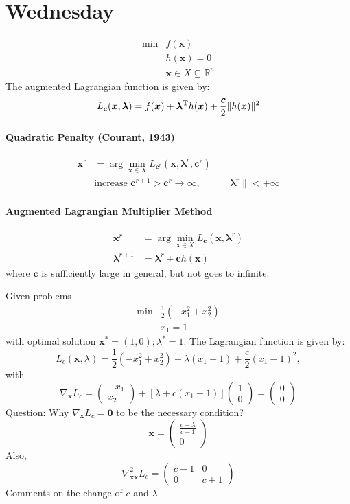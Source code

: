 \section{Wednesday}
\[
\begin{array}{ll}
\min&f(\bm x)\\
&h(\bm x)=0\\
&\bm x\in X\subseteq\mathbb{R}^n
\end{array}
\]
The augmented Lagrangian function is given by:
\[
L_{\bm c}(\bm x,\bm\lambda)=f(\bm x)+\bm\lambda^{\mathrm T} h(\bm x)+\frac{\bm c}{2}\|h(\bm x)\|^2
\]
\paragraph{Quadratic Penalty (Courant, 1943)} 
\begin{align*}
\bm x^r&=\arg\min_{\bm x\in X} L_{\bm c^r}(\bm x,\bm\lambda^r,\bm c^r)\\
&\mbox{increase $\bm c^{r+1}>\bm c^r$}\to\infty,\qquad
\|\bm\lambda^r\|<+\infty
\end{align*}

\paragraph{Augmented Lagrangian Multiplier Method}
\begin{align*}
\bm x^r&=\arg\min_{\bm x\in X}L_{\bm c}(\bm x,\bm\lambda^r)\\
\bm\lambda^{r+1}&=\bm\lambda^r+\bm c h(\bm x)
\end{align*}
where $\bm c$ is sufficiently large in general, but not goes to infinite.
\begin{example}
Given problems
\[
\begin{array}{ll}
\min&\frac{1}{2}(-x_1^2+x_2^2)\\
&x_1=1
\end{array}
\]
with optimal solution $\bm x^*=(1,0);\lambda^*=1$. The Lagrangian function is given by:
\[
L_c(\bm x,\lambda)=\frac{1}{2}(-x_1^2+x_2^2)+\lambda(x_1-1)+\frac{c}{2}(x_1-1)^2,
\]
with
\[
\nabla_{\bm x}L_c=\begin{pmatrix}
-x_1\\x_2
\end{pmatrix}+[\lambda+c(x_1-1)]\begin{pmatrix}
1\\0
\end{pmatrix}=\begin{pmatrix}
0\\0
\end{pmatrix}
\]
Question: Why $\nabla_{\bm x}L_c=\bm0$ to be the necessary condition?
\[
\bm x=\begin{pmatrix}
\frac{c-\lambda}{c-1}\\0
\end{pmatrix}
\]
Also,
\[
\nabla_{\bm{xx}}^2L_c=\begin{pmatrix}
c-1&0\\0&c+1
\end{pmatrix}
\]
Comments on the change of $c$ and $\lambda$.
\end{example}
